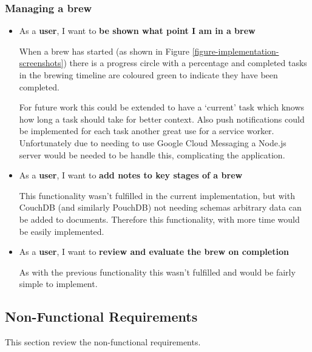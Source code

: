 \subsubsection{Managing a brew}

\begin{itemize}
  \item As a \textbf{user}, I want to \textbf{be shown what point I am in a brew}

  When a brew has started (as shown in Figure \ref{figure-implementation-screenshots}) there is a progress circle with a percentage and completed tasks in the brewing timeline are coloured green to indicate they have been completed.

  For future work this could be extended to have a `current' task which knows how long a task should take for better context. Also push notifications could be implemented for each task another great use for a service worker. Unfortunately due to needing to use Google Cloud Messaging a Node.js server would be needed to be handle this, complicating the application. \cite{google_cloud_messaging}

  \item As a \textbf{user}, I want to \textbf{add notes to key stages of a brew}

  This functionality wasn't fulfilled in the current implementation, but with CouchDB (and similarly PouchDB) not needing schemas arbitrary data can be added to documents. Therefore this functionality, with more time would be easily implemented.

  \item As a \textbf{user}, I want to \textbf{review and evaluate the brew on completion}

  As with the previous functionality this wasn't fulfilled and would be fairly simple to implement.
\end{itemize}

\subsection{Non-Functional Requirements} \label{t-e--requirements--non-functional}

This section review the non-functional requirements.

